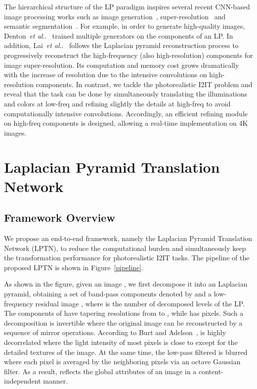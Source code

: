 \documentclass[10pt,twocolumn,letterpaper]{article}
\makeatletter
\DeclareRobustCommand\onedot{\futurelet\@let@token\@onedot}
\def\@onedot{\ifx\@let@token.\else.\null\fi\xspace}
\def\etal{\emph{et al}\onedot}
\makeatother
\begin{document}
	The hierarchical structure of the LP paradigm inspires several recent CNN-based image processing works such as image generation~\cite{denton2015deep}, super-resolution~\cite{lai2017deep} and semantic segmentation~\cite{ghiasi2016laplacian}. For example, in order to generate high-quality images, Denton~\etal~\cite{denton2015deep} trained multiple generators on the components of an LP. In addition, Lai~\etal~\cite{lai2017deep} follows the Laplacian pyramid reconstruction process to progressively reconstruct the high-frequency (also high-resolution) components for image super-resolution. Its computation and memory cost grows dramatically with the increase of resolution due to the intensive convolutions on high-resolution components. In contrast, we tackle the photorealistic I2IT problem and reveal that the task can be done by simultaneously translating the illuminations and colors at low-freq and refining slightly the details at high-freq to avoid computationally intensive convolutions. Accordingly, an efficient refining module on high-freq components is designed, allowing a real-time implementation on 4K images.
	
	
	\section{Laplacian Pyramid Translation Network}
	
	\subsection{Framework Overview}
	\label{laplacian_pyramid}
	
	We propose an end-to-end framework, namely the Laplacian Pyramid Translation Network (LPTN), to reduce the computational burden and simultaneously keep the transformation performance for photorealistic I2IT tasks. The pipeline of the proposed LPTN is shown in Figure~\ref{pipeline}.
	
	As shown in the figure, given an image , we first decompose it into an Laplacian pyramid, obtaining a set of band-pass components denoted by  and a low-frequency residual image , where  is the number of decomposed levels of the LP. The components of  have tapering resolutions from  to , while  has  pixels. Such a decomposition is invertible where the original image can be reconstructed by a sequence of mirror operations. According to Burt and Adelson~\cite{burt1983laplacian},  is highly decorrelated where the light intensity of most pixels is close to  except for the detailed textures of the image. At the same time, the low-pass filtered  is blurred where each pixel is averaged by the neighboring pixels via an octave Gaussian filter. As a result,  reflects the global attributes of an image in a content-independent manner.
	
\end{document}
